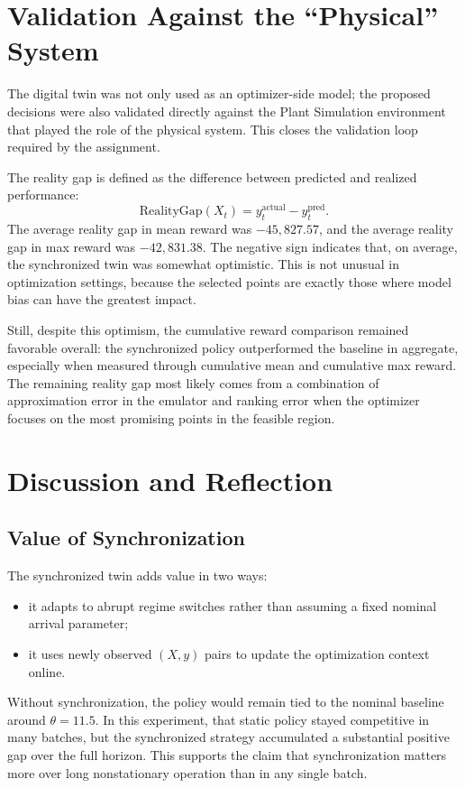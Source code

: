 \documentclass[11pt]{article}
\begin{document}
\section{Validation Against the ``Physical'' System}
The digital twin was not only used as an optimizer-side model; the proposed decisions were also validated directly against the Plant Simulation environment that played the role of the physical system. This closes the validation loop required by the assignment.

The reality gap is defined as the difference between predicted and realized performance:
\[
\text{RealityGap}(X_t)=y^{\text{actual}}_t-y^{\text{pred}}_t.
\]
The average reality gap in mean reward was \(-45{,}827.57\), and the average reality gap in max reward was \(-42{,}831.38\). The negative sign indicates that, on average, the synchronized twin was somewhat optimistic. This is not unusual in optimization settings, because the selected points are exactly those where model bias can have the greatest impact.

Still, despite this optimism, the cumulative reward comparison remained favorable overall: the synchronized policy outperformed the baseline in aggregate, especially when measured through cumulative mean and cumulative max reward. The remaining reality gap most likely comes from a combination of approximation error in the emulator and ranking error when the optimizer focuses on the most promising points in the feasible region.

\section{Discussion and Reflection}
\subsection{Value of Synchronization}
The synchronized twin adds value in two ways:
\begin{itemize}[leftmargin=1.5em]
    \item it adapts to abrupt regime switches rather than assuming a fixed nominal arrival parameter;
    \item it uses newly observed \((X,y)\) pairs to update the optimization context online.
\end{itemize}

Without synchronization, the policy would remain tied to the nominal baseline around $\theta=11.5$. In this experiment, that static policy stayed competitive in many batches, but the synchronized strategy accumulated a substantial positive gap over the full horizon. This supports the claim that synchronization matters more over long nonstationary operation than in any single batch.
\end{document}
